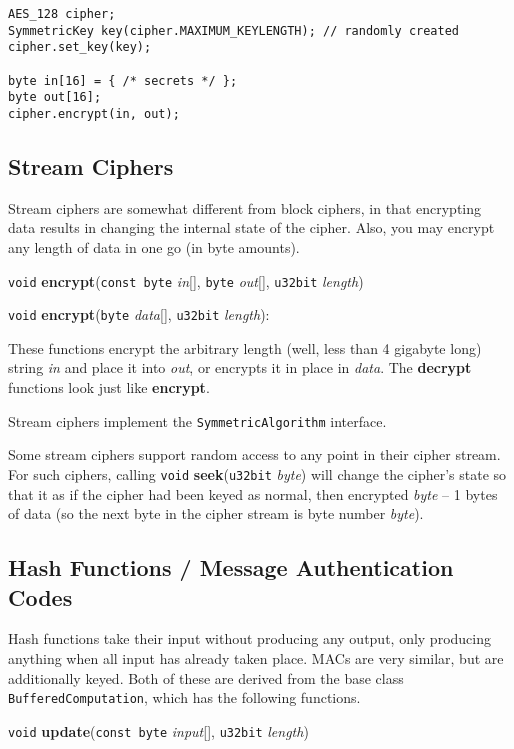 \documentclass{article}
\newcommand{\function}[1]{\textbf{#1}}
\newcommand{\type}[1]{\texttt{#1}}
\renewcommand{\arg}[1]{\textsl{#1}}
\begin{document}
\begin{verbatim}
AES_128 cipher;
SymmetricKey key(cipher.MAXIMUM_KEYLENGTH); // randomly created
cipher.set_key(key);

byte in[16] = { /* secrets */ };
byte out[16];
cipher.encrypt(in, out);
\end{verbatim}

\subsection{Stream Ciphers}

Stream ciphers are somewhat different from block ciphers, in that encrypting
data results in changing the internal state of the cipher. Also, you may
encrypt any length of data in one go (in byte amounts).

\noindent
\type{void} \function{encrypt}(\type{const byte} \arg{in}[], \type{byte}
\arg{out}[], \type{u32bit} \arg{length})

\noindent
\type{void} \function{encrypt}(\type{byte} \arg{data}[], \type{u32bit}
\arg{length}):

These functions encrypt the arbitrary length (well, less than 4 gigabyte long)
string \arg{in} and place it into \arg{out}, or encrypts it in place in
\arg{data}. The \function{decrypt} functions look just like
\function{encrypt}.

Stream ciphers implement the \type{SymmetricAlgorithm} interface.

Some stream ciphers support random access to any point in their cipher
stream. For such ciphers, calling \type{void} \function{seek}(\type{u32bit}
\arg{byte}) will change the cipher's state so that it as if the cipher had been
keyed as normal, then encrypted \arg{byte} -- 1 bytes of data (so the next byte
in the cipher stream is byte number \arg{byte}).

\subsection{Hash Functions / Message Authentication Codes}

Hash functions take their input without producing any output, only producing
anything when all input has already taken place. MACs are very similar, but are
additionally keyed. Both of these are derived from the base class
\type{BufferedComputation}, which has the following functions.

\noindent
\type{void} \function{update}(\type{const byte} \arg{input}[], \type{u32bit}
\arg{length})
\end{document}
